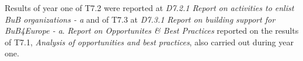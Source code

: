Results of year one of T7.2 were reported at \emph{D7.2.1 Report on activities to enlist BuB organizations - a} and of T7.3 at \emph{D7.3.1 Report on building support for BuB4Europe - a}. \emph{Report on Opportunites \& Best Practices} reported on the results of T7.1, \emph{Analysis of opportunities and best practices}, also carried out during year one.
